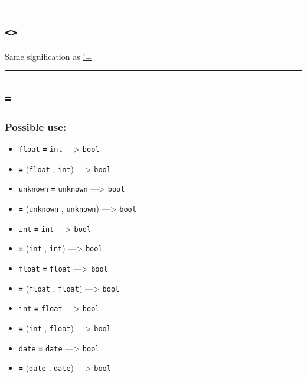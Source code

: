 \documentclass[]{book}
\providecommand{\tightlist}{%
  \setlength{\itemsep}{0pt}\setlength{\parskip}{0pt}}
\theoremstyle{definition}
\theoremstyle{definition}
\theoremstyle{definition}
\theoremstyle{remark}
\begin{document}
\begin{center}\rule{0.5\linewidth}{\linethickness}\end{center}

\subsection{\texorpdfstring{\texttt{\textless{}\textgreater{}}}{\textless{}\textgreater{}}}\label{section-14}

Same signification as \href{operators-a-to-a.html\#!=}{!=}

\begin{center}\rule{0.5\linewidth}{\linethickness}\end{center}

\subsection{\texorpdfstring{\texttt{=}}{=}}\label{section-15}

\subsubsection{Possible use:}\label{possible-use-13}

\begin{itemize}
\tightlist
\item
  \texttt{float} \textbf{\texttt{=}} \texttt{int} ---\textgreater{}
  \texttt{bool}
\item
  \textbf{\texttt{=}} (\texttt{float} , \texttt{int}) ---\textgreater{}
  \texttt{bool}
\item
  \texttt{unknown} \textbf{\texttt{=}} \texttt{unknown}
  ---\textgreater{} \texttt{bool}
\item
  \textbf{\texttt{=}} (\texttt{unknown} , \texttt{unknown})
  ---\textgreater{} \texttt{bool}
\item
  \texttt{int} \textbf{\texttt{=}} \texttt{int} ---\textgreater{}
  \texttt{bool}
\item
  \textbf{\texttt{=}} (\texttt{int} , \texttt{int}) ---\textgreater{}
  \texttt{bool}
\item
  \texttt{float} \textbf{\texttt{=}} \texttt{float} ---\textgreater{}
  \texttt{bool}
\item
  \textbf{\texttt{=}} (\texttt{float} , \texttt{float})
  ---\textgreater{} \texttt{bool}
\item
  \texttt{int} \textbf{\texttt{=}} \texttt{float} ---\textgreater{}
  \texttt{bool}
\item
  \textbf{\texttt{=}} (\texttt{int} , \texttt{float}) ---\textgreater{}
  \texttt{bool}
\item
  \texttt{date} \textbf{\texttt{=}} \texttt{date} ---\textgreater{}
  \texttt{bool}
\item
  \textbf{\texttt{=}} (\texttt{date} , \texttt{date}) ---\textgreater{}
  \texttt{bool}
\end{itemize}
\end{document}
